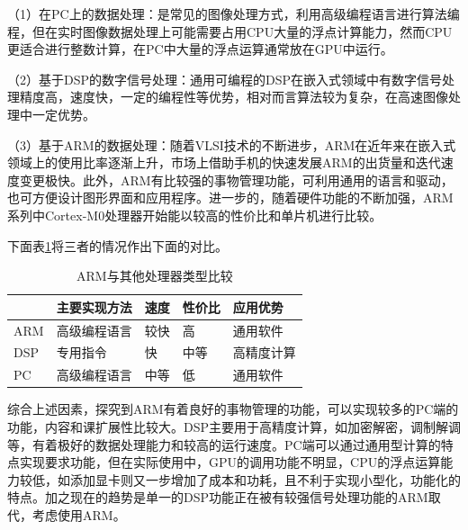 （1）在PC上的数据处理：是常见的图像处理方式，利用高级编程语言进行算法编程，但在实时图像数据处理上可能需要占用CPU大量的浮点计算能力，然而CPU更适合进行整数计算，在PC中大量的浮点运算通常放在GPU中运行。

（2）基于DSP的数字信号处理：通用可编程的DSP在嵌入式领域中有数字信号处理精度高，速度快，一定的编程性等优势，相对而言算法较为复杂，在高速图像处理中一定优势。

（3）基于ARM的数据处理：随着VLSI技术的不断进步，ARM在近年来在嵌入式领域上的使用比率逐渐上升，市场上借助手机的快速发展ARM的出货量和迭代速度变更极快。此外，ARM有比较强的事物管理功能，可利用通用的语言和驱动，也可方便设计图形界面和应用程序。进一步的，随着硬件功能的不断加强，ARM系列中Cortex-M0处理器开始能以较高的性价比和单片机进行比较。


下面表\ref{table:tabarm}将三者的情况作出下面的对比。


\begin{table}[htbp]
	\centering
	\caption{ARM与其他处理器类型比较}
	\label{table:tabarm}
\begin{tabular}{l|l|l|l|l}
	\toprule
	\rowcolor{mygray}
	    & 主要实现方法   & 速度 &  性价比 & 应用优势 \\
	\midrule
	ARM     & 高级编程语言  & 较快 & 高  & 通用软件  \\
	\rowcolor{mygray}
	DSP       & 专用指令  & 快 & 中等 & 高精度计算 \\
	PC         & 高级编程语言  & 中等 & 低  & 通用软件 \\
	\bottomrule
\end{tabular}
\end{table}

综合上述因素，探究到ARM有着良好的事物管理的功能，可以实现较多的PC端的功能，内容和课扩展性比较大。DSP主要用于高精度计算，如加密解密，调制解调等，有着极好的数据处理能力和较高的运行速度。PC端可以通过通用型计算的特点实现要求功能，但在实际使用中，GPU的调用功能不明显，CPU的浮点运算能力较低，如添加显卡则又一步增加了成本和功耗，且不利于实现小型化，功能化的特点。加之现在的趋势是单一的DSP功能正在被有较强信号处理功能的ARM取代，考虑使用ARM。




